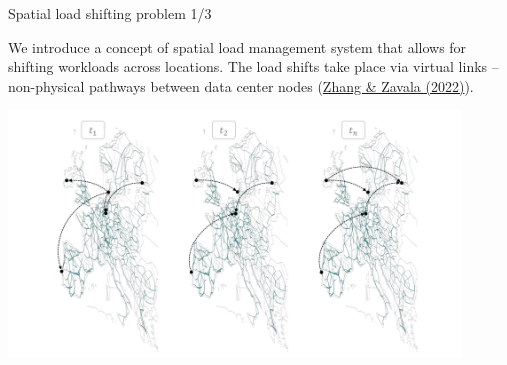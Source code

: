 \begin{frame}{Spatial load shifting problem 1/3}

  {\footnotesize

  We introduce a concept of \alert{spatial load management system} that allows for shifting workloads across locations. The load shifts take place via \alert{virtual links} -- non-physical pathways between data center nodes (\href{https://doi.org/10.1016/j.apenergy.2022.119930}{Zhang \& Zavala (2022)}).

  \centering
  \hspace*{0.7cm}\includegraphics[width=12cm]{images/spatial-vlinks.png}
  }
\end{frame}


